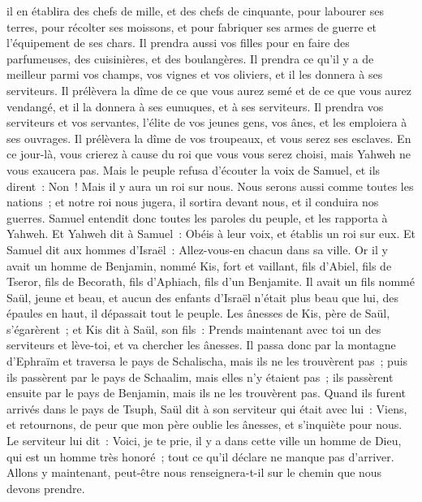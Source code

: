 \begin{multicols}{2}
il en établira des chefs de mille, et des chefs de cinquante, pour labourer ses terres, pour récolter ses moissons, et pour fabriquer ses armes de guerre et l'équipement de ses chars.
Il prendra aussi vos filles pour en faire des parfumeuses, des cuisinières, et des boulangères.
Il prendra ce qu'il y a de meilleur parmi vos champs, vos vignes et vos oliviers, et il les donnera à ses serviteurs.
Il prélèvera la dîme de ce que vous aurez semé et de ce que vous aurez vendangé, et il la donnera à ses eunuques, et à ses serviteurs.
Il prendra vos serviteurs et vos servantes, l'élite de vos jeunes gens, vos ânes, et les emploiera à ses ouvrages.
Il prélèvera la dîme de vos troupeaux, et vous serez ses esclaves.
En ce jour-là, vous crierez à cause du roi que vous vous serez choisi, mais Yahweh ne vous exaucera pas.
Mais le peuple refusa d'écouter la voix de Samuel, et ils dirent~: Non~! Mais il y aura un roi sur nous.
Nous serons aussi comme toutes les nations~; et notre roi nous jugera, il sortira devant nous, et il conduira nos guerres.
Samuel entendit donc toutes les paroles du peuple, et les rapporta à Yahweh.
Et Yahweh dit à Samuel~: Obéis à leur voix, et établis un roi sur eux. Et Samuel dit aux hommes d'Israël~: Allez-vous-en chacun dans sa ville.
\VerseOne{}Or il y avait un homme de Benjamin, nommé Kis, fort et vaillant, fils d'Abiel, fils de Tseror, fils de Becorath, fils d'Aphiach, fils d'un Benjamite.
Il avait un fils nommé Saül, jeune et beau, et aucun des enfants d'Israël n'était plus beau que lui, des épaules en haut, il dépassait tout le peuple.
Les ânesses de Kis, père de Saül, s'égarèrent~; et Kis dit à Saül, son fils~: Prends maintenant avec toi un des serviteurs et lève-toi, et va chercher les ânesses.
Il passa donc par la montagne d'Ephraïm et traversa le pays de Schalischa, mais ils ne les trouvèrent pas~; puis ils passèrent par le pays de Schaalim, mais elles n'y étaient pas~; ils passèrent ensuite par le pays de Benjamin, mais ils ne les trouvèrent pas.
Quand ils furent arrivés dans le pays de Tsuph, Saül dit à son serviteur qui était avec lui~: Viens, et retournons, de peur que mon père oublie les ânesses, et s'inquiète pour nous.
Le serviteur lui dit~: Voici, je te prie, il y a dans cette ville un homme de Dieu, qui est un homme très honoré~; tout ce qu'il déclare ne manque pas d'arriver. Allons y maintenant, peut-être nous renseignera-t-il sur le chemin que nous devons prendre.

\end{multicols}
